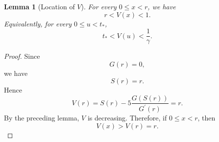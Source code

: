\documentclass[11pt,a4paper]{article}
\numberwithin{equation}{section}
\numberwithin{table}{section}
\theoremstyle{plain}
\newtheorem{lemma}[theorem]{Lemma}
\theoremstyle{definition}\newtheorem{definition}[theorem]{Definition}
\theoremstyle{remark}\newtheorem{remark}[theorem]{Remark}
\begin{document}
\begin{lemma}[Location of $V$]\label{supp:s2lemma5}
For every $0\leq x<r$, we have 
\begin{equation*}
r<V(x)<1.
\end{equation*}
Equivalently, for every $0\leq u<t_*$, 
\begin{equation*}
t_*<V(u)<\frac1\gamma.
\end{equation*}
\end{lemma}

\begin{proof}
Since 
\begin{equation*}
G(r)=0,
\end{equation*}%
we have 
\begin{equation*}
S(r)=r.
\end{equation*}
Hence 
\begin{equation*}
V(r)=S(r)-5\frac{G(S(r))}{G^{\prime }(r)}=r.
\end{equation*}%
By the preceding lemma, $V$ is decreasing. Therefore, if $0\leq x<r$,
then 
\begin{equation*}
V(x)>V(r)=r.
\end{equation*}


\end{proof}
\end{document}

